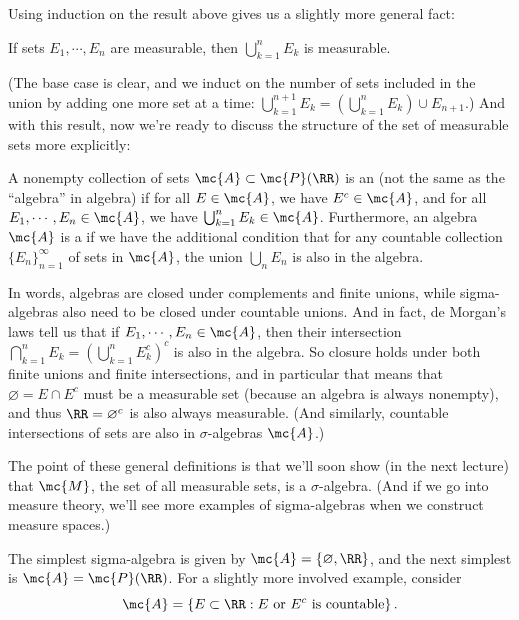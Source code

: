 Using induction on the result above gives us a slightly more general fact:

\begin{corollary}
If sets $E_1, \cdots, E_n$ are measurable, then $\bigcup_{k=1}^n E_k$ is measurable.
\end{corollary}

(The base case is clear, and we induct on the number of sets included in the union by adding one more set at a time: $\bigcup_{k=1}^{n+1} E_k = \left(\bigcup_{k=1}^n E_k\right) \cup E_{n+1}$.) And with this result, now we're ready to discuss the structure of the set of measurable sets more explicitly:

\begin{definition}
A nonempty collection of sets $\mc{A} \subset \mc{P}(\RR)$ is an  (not the same as the ``algebra'' in algebra) if for all $E \in \mc{A}$, we have $E^c \in \mc{A}$, and for all $E_1, \cdots, E_n \in \mc{A}$, we have $\bigcup_{k=1}^n E_k \in \mc{A}$. Furthermore, an algebra $\mc{A}$ is a  if we have the additional condition that for any countable collection $\{E_n\}_{n=1}^\infty$ of sets in $\mc{A}$, the union $\bigcup_n E_n$ is also in the algebra.
\end{definition}

In words, algebras are closed under complements and finite unions, while sigma-algebras also need to be closed under countable unions. And in fact, de Morgan's laws tell us that if $E_1, \cdots, E_n \in \mc{A}$, then their intersection $\bigcap_{k=1}^n E_k = \left(\bigcup_{k=1}^n E_k^c\right)^c$ is also in the algebra. So closure holds under both finite unions and finite intersections, and in particular that means that $\varnothing = E \cap E^c$ must be a measurable set (because an algebra is always nonempty), and thus $\RR = \varnothing^c$ is also always measurable. (And similarly, countable intersections of sets are also in $\sigma$-algebras $\mc{A}$.)

The point of these general definitions is that we'll soon show (in the next lecture) that $\mc{M}$, the set of all measurable sets, is a $\sigma$-algebra. (And if we go into measure theory, we'll see more examples of sigma-algebras when we construct measure spaces.)

\begin{example}
The simplest sigma-algebra is given by $\mc{A} = \{\varnothing, \RR\}$, and the next simplest is $\mc{A} = \mc{P}(\RR)$. For a slightly more involved example, consider 
\[
    \mc{A} = \left\{E \subset \RR: E \text{ or }E^c \text{ is countable} \right\}.
\]
\end{example}

